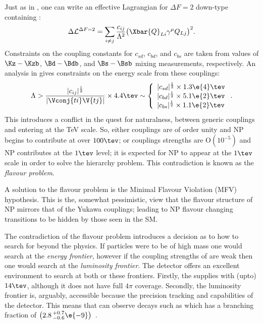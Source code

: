 Just as in , one can write an effective Lagrangian for $\Delta F=2$ down-type
\fcncs containing \np:
\begin{equation}
  \Delta\mathcal{L}^{\Delta F=2} =
  \sum_{i\neq j}\frac{c_{ij}}{\Lambda^2}
  \big(\Xbar{Q}_{Li}\gamma^\mu Q_{Lj}\big)^2.
\end{equation}
Constraints on the coupling constants for $c_{sd}$, $c_{bd}$, and $c_{bs}$ are taken from
values of $\Kz-\Kzb$, $\Bd-\Bdb$, and $\Bs-\Bsb$ mixing measurements, respectively.
An analysis in  gives constraints on the energy scale from these couplings:
\begin{equation}
  \Lambda > \frac{|c_{ij}|^\frac12}{|\Vconj{ti}\V{tj}|}\times4.4\tev
  \sim
  \left\{
    \begin{array}{l}
      |c_{sd}|^\frac12\times 1.3\e{4}\tev \\
      |c_{bd}|^\frac12\times 5.1\e{2}\tev \\
      |c_{bs}|^\frac12\times 1.1\e{2}\tev \\
    \end{array}\right..
\end{equation}
This introduces a conflict in the quest for naturalness, between generic couplings and \np entering
at the TeV scale.
So, either couplings are of order unity and NP begins to contribute at over $100\tev$; or couplings
strengths are $\mathrm{O}(10^{-5})$ and NP contributes at the $1\tev$ level;
it is expected for NP to appear at the $1\tev$ scale in order to solve the hierarchy problem.
This contradiction is known as the \emph{flavour problem}.

A solution to the flavour problem is the Minimal Flavour Violation (MFV) hypothesis.
This is the, somewhat pessimistic, view that the flavour structure of NP mirrors that of the Yukawa
couplings; leading to NP flavour changing transitions to be hidden by those seen in the SM.


The contradiction of the flavour problem introduces a decision as to how to search for beyond the
\sm physics.
If \np particles were to be of high mass one would search at the \emph{energy frontier},
however if the coupling strengths of \np are weak then one would search at the
\emph{luminosity frontier}.
The \lhcb detector offers an excellent environment to search at both or these frontiers.
Firstly, the \lhc supplies \lhcb with (upto) $14\tev$, although it does not have full $4\pi$
coverage.
Secondly, the luminosity frontier is, arguably, accessible because the precision tracking and \pid
capabilities of the \lhcb detector.
This means that \lhcb can observe decays such as \decay{\Bs}{\mumu} which has a branching fraction
of $\big(2.8\,^{+0.7}_{-0.6}\e{-9}\big)$~\cite{LHCb-PAPER-2014-049}.






